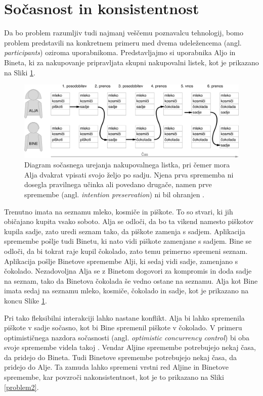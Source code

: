 \documentclass[a4paper, 12pt, twoside]{book}
\begin{document}
\section{Sočasnost in konsistentnost}
\label{sec:con}

Da bo problem razumljiv tudi najmanj veščemu poznavalcu tehnologij, bomo problem predstavili na konkretnem primeru \cite{problem} med dvema udeležencema (angl. \textit{participants}) oziroma uporabnikoma. Predstavljajmo si uporabnika Aljo in Bineta, ki za nakupovanje pripravljata skupni nakupovalni listek, kot je prikazano na Sliki \ref{problem1}.

\begin{figure}[placement h]
\begin{center}
\includegraphics[width=16cm]{img/problem1.pdf}
\end{center}
\caption{Diagram sočasnega urejanja nakupovalnega listka, pri čemer mora Alja dvakrat vpisati svojo željo po sadju. Njena prva sprememba ni dosegla pravilnega učinka ali povedano drugače, namen prve spremembe (angl. \textit{intention preservation}) ni bil ohranjen \cite{sigce}.}
\label{problem1}
\end{figure}

Trenutno imata na seznamu mleko, kosmiče in piškote. To so stvari, ki jih običajano kupita vsako soboto. Alja se odloči, da bo ta vikend namesto piškotov kupila sadje, zato uredi seznam tako, da piškote zamenja s sadjem. Aplikacija spremembe pošlje tudi Binetu, ki nato vidi piškote zamenjane s sadjem. Bine se odloči, da bi tokrat raje kupil čokolado, zato temu primerno spremeni seznam. Aplikacija pošlje Binetove spremembe Alji, ki sedaj vidi sadje, zamenjano s čokolado. Nezadovoljna Alja se z Binetom dogovori za kompromis in doda sadje na seznam, tako da Binetova čokolada še vedno ostane na seznamu. Alja kot Bine imata sedaj na seznamu mleko, kosmiče, čokolado in sadje, kot je prikazano na koncu Slike \ref{problem1}.

Pri tako fleksibilni interakciji lahko nastane konflikt. Alja bi lahko spremenila piškote v sadje sočasno, kot bi Bine spremenil piškote v čokolado. V primeru optimističnega nazdora sočasnosti (angl. \textit{optimistic concurrency control}) bi oba svoje spremembe videla takoj \cite{hllbw}. Vendar Aljine spremembe potrebujejo nekaj časa, da pridejo do Bineta. Tudi Binetove spremembe potrebujejo nekaj časa, da pridejo do Alje. Ta zamuda lahko spremeni vrstni red Aljine in Binetove spremembe, kar povzroči nakonsistentnost, kot je to prikazano na Sliki \ref{problem2}.
\end{document}
